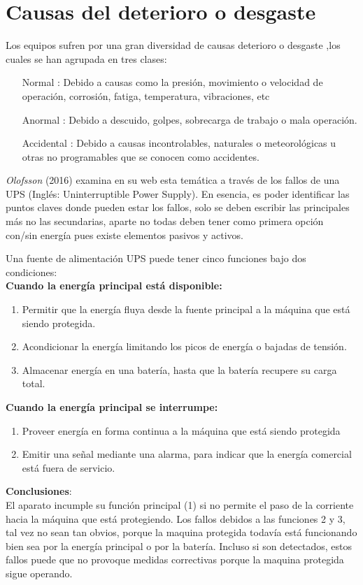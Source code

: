 \documentclass[
	12pt, %
	fleqn, %
	a4paper, %
]{LegrandOrangeBook}
\begin{document}
\section{Causas del deterioro o desgaste}
Los equipos sufren por una gran diversidad de causas deterioro o desgaste ,los cuales se han agrupada en tres clases:
\begin{itemize}
\item[Normal]: Debido a causas como la presión, movimiento o velocidad de operación, corrosión, fatiga, temperatura, vibraciones, etc
\item[Anormal]: Debido a descuido, golpes, sobrecarga de trabajo o mala operación.
\item[Accidental]: Debido a causas incontrolables, naturales o meteorológicas u otras no programables que se conocen como accidentes.
\end{itemize}
\emph{Olofsson} (2016) examina en su web esta temática a través de los fallos de una UPS
(Inglés: Uninterruptible Power Supply). En esencia, es poder identificar las puntos claves donde pueden estar los fallos, solo se deben escribir las principales más no las secundarias, aparte no todas deben tener como primera opción con/sin energía pues existe elementos pasivos y activos.
\begin{example}
Una fuente de alimentación UPS puede tener cinco funciones bajo dos condiciones:\\
\textbf{Cuando la energía principal está disponible: }
\begin{enumerate}
\item Permitir que la energía fluya desde la fuente principal a la máquina que está siendo protegida.
\item Acondicionar la energía limitando los picos de energía o bajadas de tensión.
\item Almacenar energía en una batería, hasta que la batería recupere su carga total.
\end{enumerate}
\textbf{Cuando la energía principal se interrumpe:}
\begin{enumerate}
\item Proveer energía en forma continua a la máquina que está siendo protegida
\item Emitir una señal mediante una alarma, para indicar que la energía comercial está fuera de servicio.
\end{enumerate}
\textbf{Conclusiones}:\\
El aparato incumple su función principal (1) si no permite el paso de la corriente hacia la máquina que está protegiendo. Los fallos debidos a las funciones 2 y 3, tal vez no sean tan obvios, porque la maquina protegida todavía está funcionando bien sea por la energía principal o por la batería. Incluso si son detectados, estos fallos puede que no provoque medidas correctivas porque la maquina
protegida sigue operando.
\end{example}
\end{document}
